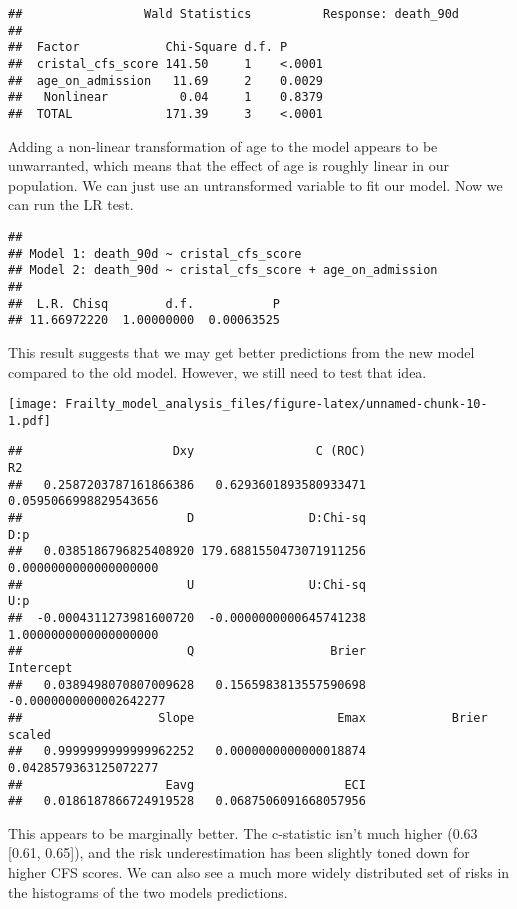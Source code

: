\documentclass[
]{article}
\begin{document}
\begin{verbatim}
##                 Wald Statistics          Response: death_90d 
## 
##  Factor            Chi-Square d.f. P     
##  cristal_cfs_score 141.50     1    <.0001
##  age_on_admission   11.69     2    0.0029
##   Nonlinear          0.04     1    0.8379
##  TOTAL             171.39     3    <.0001
\end{verbatim}

Adding a non-linear transformation of age to the model appears to be
unwarranted, which means that the effect of age is roughly linear in our
population. We can just use an untransformed variable to fit our model.
Now we can run the LR test.

\begin{verbatim}
## 
## Model 1: death_90d ~ cristal_cfs_score
## Model 2: death_90d ~ cristal_cfs_score + age_on_admission
## 
##  L.R. Chisq        d.f.           P 
## 11.66972220  1.00000000  0.00063525
\end{verbatim}

This result suggests that we may get better predictions from the new
model compared to the old model. However, we still need to test that
idea.

\texttt{[image: Frailty\_model\_analysis\_files/figure-latex/unnamed-chunk-10-1.pdf]}

\begin{verbatim}
##                     Dxy                 C (ROC)                      R2 
##   0.2587203787161866386   0.6293601893580933471   0.0595066998829543656 
##                       D                D:Chi-sq                     D:p 
##   0.0385186796825408920 179.6881550473071911256   0.0000000000000000000 
##                       U                U:Chi-sq                     U:p 
##  -0.0004311273981600720  -0.0000000000645741238   1.0000000000000000000 
##                       Q                   Brier               Intercept 
##   0.0389498070807009628   0.1565983813557590698  -0.0000000000002642277 
##                   Slope                    Emax            Brier scaled 
##   0.9999999999999962252   0.0000000000000018874   0.0428579363125072277 
##                    Eavg                     ECI 
##   0.0186187866724919528   0.0687506091668057956
\end{verbatim}

This appears to be marginally better. The c-statistic isn't much higher
(0.63 {[}0.61, 0.65{]}), and the risk underestimation has been slightly
toned down for higher CFS scores. We can also see a much more widely
distributed set of risks in the histograms of the two models
predictions.
\end{document}
